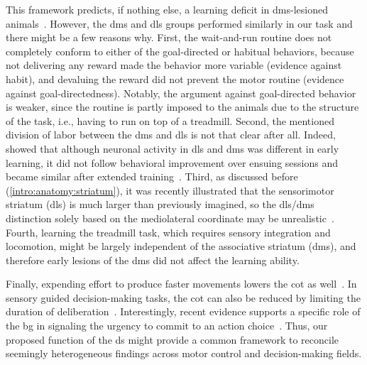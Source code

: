This framework predicts, if nothing else, a learning deficit in \gls{dms}-lesioned animals~\cite{Hart2018CurrBiol}.
However, the \gls{dms} and \gls{dls} groups performed similarly in our task and there might be a few reasons why.
First, the wait-and-run routine does not completely conform to either of the goal-directed or habitual behaviors, because not delivering any reward made the behavior more variable (evidence against habit), and devaluing the reward did not prevent the motor routine (evidence against goal-directedness).
Notably, the argument against goal-directed behavior is weaker, since the routine is partly imposed to the animals due to the structure of the task, i.e., having to run on top of a treadmill.
Second, the mentioned division of labor between the \gls{dms} and \gls{dls} is not that clear after all.
Indeed,  showed that although neuronal activity in \gls{dls} and \gls{dms} was different in early learning, it did not follow behavioral improvement over ensuing sessions and became similar after extended training~\cite{Vandaele2019Elife}.
Third, as discussed before (\autoref{intro:anatomy:striatum}), it was recently illustrated that the sensorimotor striatum (\gls{dls}) is much larger than previously imagined, so the \gls{dls}/\gls{dms} distinction solely based on the mediolateral coordinate may be unrealistic~\cite{Hunnicutt2016, Hintiryan2016NN}.
Fourth, learning the treadmill task, which requires sensory integration and locomotion, might be largely independent of the associative striatum (\gls{dms}), and therefore early lesions of the \gls{dms} did not affect the learning ability.
\par
Finally, expending effort to produce faster movements lowers the \gls{cot} as well~\cite{Shadmehr2019TINS}.
In sensory guided decision-making tasks, the \gls{cot} can also be reduced by limiting the duration of deliberation~\cite{Carland2019NeuroSci}.
Interestingly, recent evidence supports a specific role of the \gls{bg} in signaling the urgency to commit to an action choice~\cite{Thura2017Neruon,Carland2019NeuroSci}.
Thus, our proposed function of the \gls{ds} might provide a common framework to reconcile seemingly heterogeneous findings across motor control and decision-making fields.